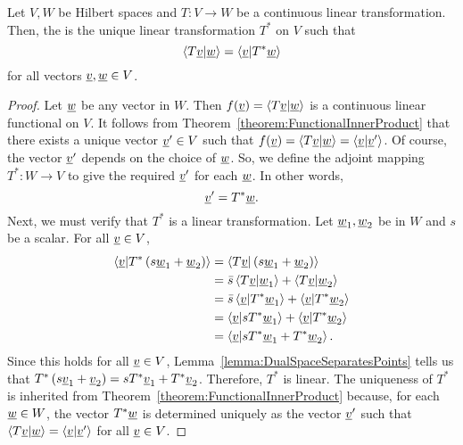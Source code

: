 \begin{theorem}
Let $V,W$ be Hilbert spaces and $T: V \rightarrow W$ be a continuous linear transformation.
Then, the  is the unique linear transformation $T^*$ on $V$ such that
\begin{equation*}
\left\langle T \underline{v} | \underline{w} \right\rangle
= \left\langle \underline{v} | T^* \underline{w} \right\rangle
\end{equation*}
for all vectors $\underline{v}, \underline{w} \in V$.
\end{theorem}
\begin{proof}
Let $\underline{w}$ be any vector in $W$.
Then $f(\underline{v}) = \left\langle T \underline{v} | \underline{w} \right\rangle$ is a continuous linear functional on $V$.
It follows from Theorem~\ref{theorem:FunctionalInnerProduct} that there exists a unique vector $\underline{v}' \in V$ such that $f(\underline{v}) = \left\langle T \underline{v} | \underline{w} \right\rangle = \left\langle \underline{v} | \underline{v}' \right\rangle$.
Of course, the vector $\underline{v}'$ depends on the choice of $\underline{w}$.
So, we define the adjoint mapping $T^* : W \rightarrow V$ to give the required $\underline{v}'$ for each $\underline{w}$.
In other words,
\begin{equation*}
\underline{v}' = T^* \underline{w} .
\end{equation*}
Next, we must verify that $T^*$ is a linear transformation.
Let $\underline{w}_1, \underline{w}_2$ be in $W$ and $s$ be a scalar.
For all $\underline{v} \in V$,
\begin{equation*}
\begin{split}
\left\langle \underline{v} | T^* \left( s \underline{w}_1 + \underline{w}_2 \right) \right\rangle
&= \left\langle T \underline{v} | \left( s \underline{w}_1 + \underline{w}_2 \right) \right\rangle \\
&= \bar{s} \left\langle T \underline{v} | \underline{w}_1 \right\rangle
+ \left\langle T \underline{v} | \underline{w}_2 \right\rangle \\
&= \bar{s} \left\langle \underline{v} | T^* \underline{w}_1 \right\rangle
+ \left\langle \underline{v} | T^* \underline{w}_2 \right\rangle \\
&= \left\langle \underline{v} | s T^* \underline{w}_1 \right\rangle
+ \left\langle \underline{v} | T^* \underline{w}_2 \right\rangle \\
&= \left\langle \underline{v} | s T^* \underline{w}_1 + T^* \underline{w}_2 \right\rangle .
\end{split}
\end{equation*}
Since this holds for all $\underline{v} \in V$, Lemma~\ref{lemma:DualSpaceSeparatesPoints} tells us that $T^* \left( s \underline{v}_1 + \underline{v}_2 \right) = s T^* \underline{v}_1 + T^* \underline{v}_2$.
Therefore, $T^*$ is linear.
The uniqueness of $T^*$ is inherited from Theorem~\ref{theorem:FunctionalInnerProduct} because, for each $\underline{w}\in W$, the vector $T^* \underline{w}$ is determined uniquely as the vector $\underline{v}'$ such that $\left\langle T \underline{v} | \underline{w} \right\rangle = \left\langle \underline{v} | \underline{v}' \right\rangle$ for all $\underline{v} \in V$.
\end{proof}

